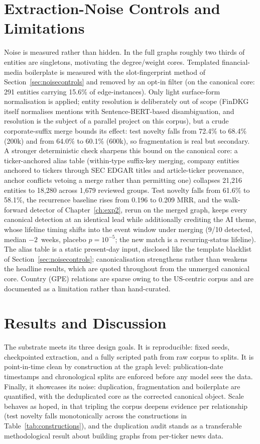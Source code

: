 \documentclass[a4paper,12pt]{report}
\begin{document}
\section{Extraction-Noise Controls and Limitations}
\label{sec:exp1noise}
Noise is measured rather than hidden. In the full graphs roughly two thirds of
entities are singletons, motivating the degree/weight cores. Templated
financial-media boilerplate is measured with the slot-fingerprint method of
Section~\ref{sec:noisecontrols} and removed by an opt-in filter (on the
canonical core: 291 entities carrying 15.6\% of edge-instances). Only light
surface-form normalisation is applied; entity resolution is deliberately out
of scope (FinDKG itself normalises mentions with Sentence-BERT-based
disambiguation, and resolution is the subject of a parallel project on
this corpus), but a crude corporate-suffix merge bounds its effect: test
novelty falls from 72.4\% to 68.4\% (200k) and from 64.0\% to 60.1\% (600k),
so fragmentation is real but secondary.
A stronger deterministic check sharpens this bound on the canonical core:
a ticker-anchored alias table (within-type suffix-key merging, company
entities anchored to tickers through SEC EDGAR titles and article-ticker
provenance, anchor conflicts vetoing a merge rather than permitting one)
collapses 21{,}216 entities to 18{,}280 across 1{,}679 reviewed groups.
Test novelty falls from 61.6\% to 58.1\%, the recurrence baseline rises
from 0.196 to 0.209 MRR, and the walk-forward detector of
Chapter~\ref{ch:exp2}, rerun on the merged graph, keeps every canonical
detection at an identical lead while additionally crediting the AI theme,
whose lifeline timing shifts into the event window under merging
(9/10 detected, median $-2$~weeks, placebo $p = 10^{-5}$; the new match
is a recurring-status lifeline). The alias table is a static present-day
input, disclosed like the template blacklist of
Section~\ref{sec:noisecontrols}; canonicalisation strengthens rather than
weakens the headline results, which are quoted throughout from the
unmerged canonical core. Country (GPE) relations are sparse
owing to the US-centric corpus and are documented as a limitation rather than
hand-curated.

\section{Results and Discussion}
The substrate meets its three design goals. It is reproducible: fixed
seeds, checkpointed extraction, and a fully scripted path from raw corpus to
splits. It is point-in-time clean by construction at the graph level:
publication-date timestamps and chronological splits are enforced before any
model sees the data. Finally, it showcases its noise: duplication,
fragmentation and boilerplate are quantified, with the deduplicated core as
the corrected canonical object. Scale behaves as hoped, in that tripling the corpus deepens evidence per
relationship (test novelty falls monotonically across the constructions in
Table~\ref{tab:constructions}), and the duplication audit stands as a transferable methodological result about
building graphs from per-ticker news data.
\end{document}
